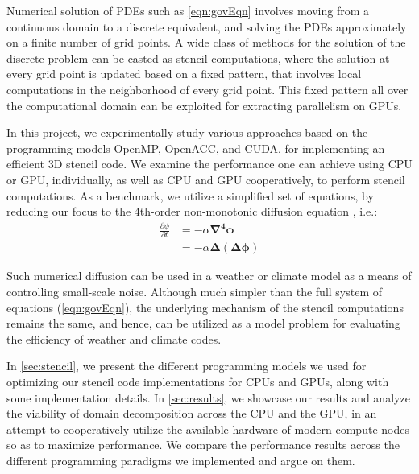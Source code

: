 Numerical solution of PDEs such as \cref{eqn:govEqn} involves moving from a continuous domain to a discrete equivalent, and solving the PDEs approximately on a finite number of grid points.
A wide class of methods for the solution of the discrete problem can be casted as stencil computations, where the solution at every grid point is updated based on a fixed pattern, that involves local computations in the neighborhood of every grid point.
This fixed pattern all over the computational domain can be exploited for extracting parallelism on GPUs. 

In this project, we experimentally study various approaches based on the programming models OpenMP, OpenACC, and CUDA, for implementing an efficient 3D stencil code. 
We examine the performance one can achieve using CPU or GPU, individually, as well as CPU and GPU cooperatively, \cite{PAPADRAKAKIS20111490} to perform stencil computations.
As a benchmark, we utilize a simplified set of equations, by reducing our focus to the 4th-order non-monotonic diffusion equation \cite{MING2000}, i.e.: 
\begin{equation}
\begin{aligned}
\frac{\partial \phi}{\partial t} &=-\alpha \boldsymbol{\nabla^{4} \phi} \\
&=-\alpha  \boldsymbol{\Delta \left(\Delta  \phi\right)}
\end{aligned}
\label{eq:diff4}
\end{equation}

Such numerical diffusion can be used in a weather or climate model as a means of controlling small-scale noise.
Although much simpler than the full system of equations (\ref{eqn:govEqn}), the underlying mechanism of the stencil computations remains the same, and hence, can be utilized as a model problem for evaluating the efficiency of weather and climate codes.

In \cref{sec:stencil}, we present the different programming models we used for optimizing our stencil code implementations for CPUs and GPUs, along with some implementation details. 
In \cref{sec:results}, we showcase our results and analyze the viability of domain decomposition across the CPU and the GPU, in an attempt to cooperatively utilize the available hardware of modern compute nodes so as to maximize performance.
We compare the performance results across the different programming paradigms we implemented and argue on them. 